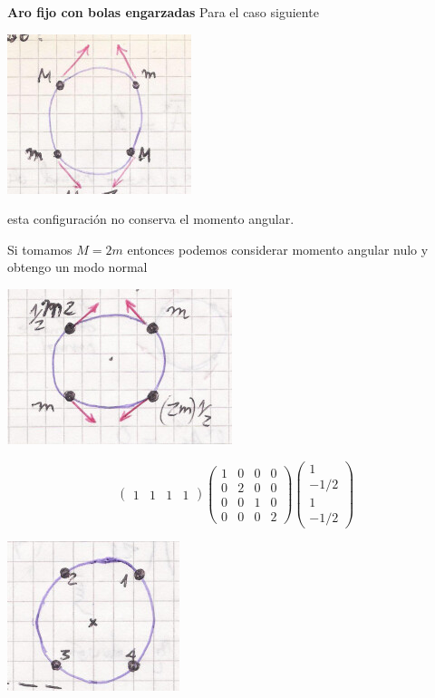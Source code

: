 \documentclass[10pt,oneside]{CBFT_book}
\begin{document}
\begin{ejemplo}{\bf Aro fijo con bolas engarzadas}
Para el caso siguiente 

\includegraphics[scale=0.5]{images/fig_mc_problema_aro_modos_normales_6.jpg} 

esta configuración no conserva el momento angular.

Si tomamos $M=2m$ entonces podemos considerar momento angular nulo y obtengo un modo normal

\includegraphics[scale=0.5]{images/fig_mc_problema_aro_modos_normales_7.jpg} 
 
\[
	\begin{pmatrix}
	 1 & 1 & 1 & 1 
	\end{pmatrix}
	\begin{pmatrix}
	 1 & 0 & 0 & 0 \\
	 0 & 2 & 0 & 0 \\
	 0 & 0 & 1 & 0 \\
	 0 & 0 & 0 & 2
	\end{pmatrix}
	\begin{pmatrix}
	 1 \\
	 -1/2 \\
	 1 \\
	 -1/2
	\end{pmatrix}
\] 


\includegraphics[scale=0.35]{images/fig_mc_problema_aro_modos_normales_8.jpg} 


\end{ejemplo}
\end{document}
